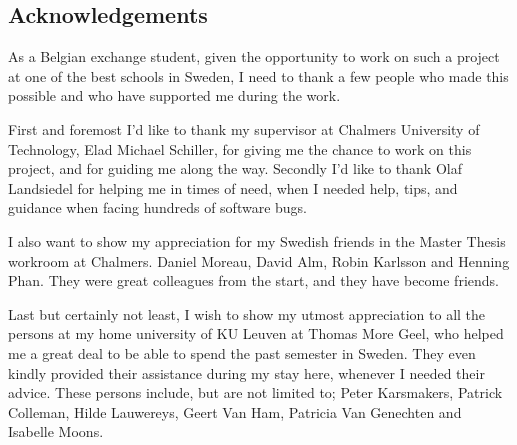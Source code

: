 \subsection{Acknowledgements}\label{acknowledgements}

As a Belgian exchange student, given the opportunity to work on such a
project at one of the best schools in Sweden, I need to thank a few
people who made this possible and who have supported me during the work.

First and foremost I'd like to thank my supervisor at Chalmers
University of Technology, Elad Michael Schiller, for giving me the
chance to work on this project, and for guiding me along the way.
Secondly I'd like to thank Olaf Landsiedel for helping me in times of
need, when I needed help, tips, and guidance when facing hundreds of
software bugs.

I also want to show my appreciation for my Swedish friends in the Master
Thesis workroom at Chalmers. Daniel Moreau, David Alm, Robin Karlsson
and Henning Phan. They were great colleagues from the start, and they
have become friends.

Last but certainly not least, I wish to show my utmost appreciation to
all the persons at my home university of KU Leuven at Thomas More Geel,
who helped me a great deal to be able to spend the past semester in
Sweden. They even kindly provided their assistance during my stay here,
whenever I needed their advice. These persons include, but are not
limited to; Peter Karsmakers, Patrick Colleman, Hilde Lauwereys, Geert
Van Ham, Patricia Van Genechten and Isabelle Moons.
